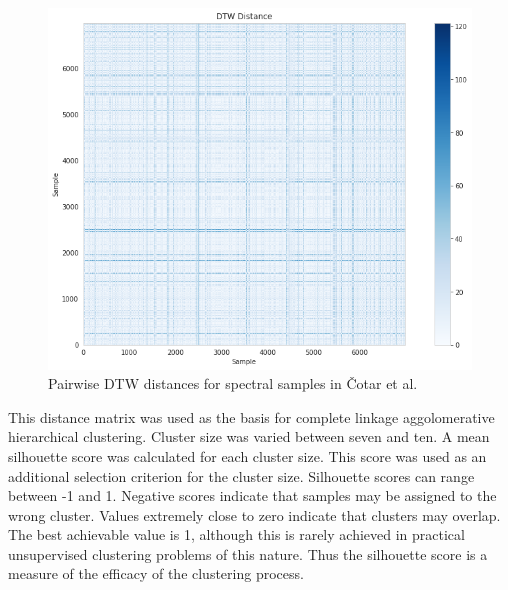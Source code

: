 \begin{figure}[!htb]
\centering
\includegraphics[scale=0.60]{figures/dtw cotar.png}
\caption{Pairwise DTW distances for spectral samples in Čotar et al.}
\end{figure}

This distance matrix was used as the basis for complete linkage aggolomerative hierarchical clustering. Cluster size was varied between seven and ten. A mean silhouette score was calculated for each cluster size. This score was used as an additional selection criterion for the cluster size. Silhouette scores can range between -1 and 1. Negative scores indicate that samples may be assigned to the wrong cluster. Values extremely close to zero indicate that clusters may overlap. The best achievable value is 1, although this is rarely achieved in practical unsupervised clustering problems of this nature. Thus the silhouette score is a measure of the efficacy of the clustering process.

